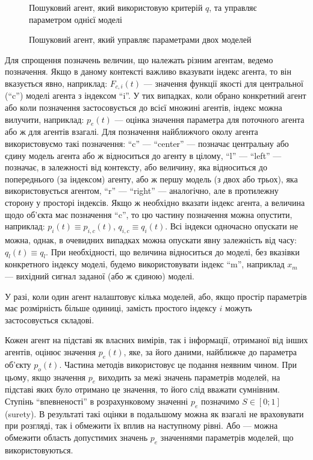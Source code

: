 \begin{figure}[htb!]
\begin{center}

\end{center}
\caption{Пошуковий агент, який використовую критерій $q$, та управляє параметром однієї моделі}
\label{atu:f:agent1q}
\end{figure}


\begin{figure}[htb!]
\begin{center}

\end{center}
\caption{Пошуковий агент, який управляє параметрами двох моделей}
\label{atu:f:agent2}
\end{figure}

Для спрощення позначень величин, що належать різним агентам, ведемо
позначення. Якщо в даному контексті важливо вказувати індекс агента, то він
вказується явно, наприклад: $F_{c, i} (t)$ --- значення функції якості для
центральної (``c'') моделі агента з індексом ``i''. У тих випадках, коли
обрано конкретний агент або коли позначення застосовується до всієї множині
агентів, індекс можна вилучити, наприклад: $ p_e (t)$
--- оцінка значення параметра для поточного агента або ж для агентів взагалі.
Для позначення найближчого околу агента використовуємо такі позначення:
``c'' --- ``center'' --- позначає центральну або єдину модель агента або ж
відноситься до агенту в цілому, ``l'' --- ``left'' --- позначає, в
залежності від контексту, або величину, яка відноситься до попереднього (за
індексом) агенту, або ж першу модель (з двох або трьох), яка використовується
агентом, ``r'' --- ``right'' --- аналогічно, але в протилежну сторону у
просторі індексів.
Якщо ж необхідно вказати індекс агента, а величина щодо
об'єкта має позначення ``c'', то цю частину позначення можна опустити,
наприклад: $p_i (t) \equiv p_{i, c} (t)$, $q_{i , c} \equiv q_{i} (t)$.
Всі індекси одночасно опускати не можна, однак, в очевидних випадках можна
опускати явну залежність від часу: $q_l (t) \equiv q_l$. При необхідності,
що величина відноситься до моделі, без вказівки конкретного індексу моделі,
будемо використовувати індекс ``m'', наприклад $x_m$ --- вихідний сигнал
заданої (або ж єдиною) моделі.

У разі, коли один агент налаштовує кілька моделей, або, якщо
простір параметрів має розмірність більше одиниці, замість
простого індексу
$ i $ можуть застосовується складові.

Кожен агент на підставі як власних вимірів, так і інформації, отриманої від
інших агентів, оцінює значення $p_e (t)$, яке, за його даними, найближче до
параметра об'єкту $p_o(t)$.
Частина методів використовує це подання неявним чином. При цьому,
якщо значення $p_e$ виходить за межі значень параметрів моделей, на підставі
яких було отримано це значення, то його слід вважати сумнівним.
Ступінь ``впевненості'' в розрахунковому значенні $p_e$ позначимо $S \in [0; 1] $\label{atu:d:S} (surety).
В результаті такі оцінки в подальшому можна як
взагалі не враховувати при розгляді, так і обмежити їх вплив на наступному
рівні.
Або --- можна обмежити область допустимих значень $p_e$
значеннями параметрів моделей, що використовуються.

